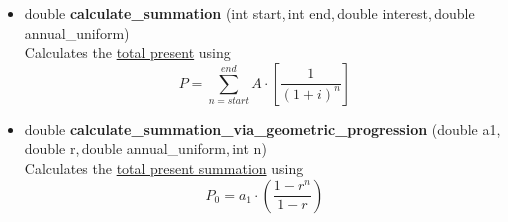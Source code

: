 \documentclass[english,12pt,a4paper,twoside,titlepage,leqno,fleqn]{article}
\begin{document}
\begin{enumerate}
\begin{enumerate}
\begin{itemize}
\item double {\bfseries calculate\_summation} \small{(int start,\,int end,\,double interest,\,double annual\_uniform)}\\
Calculates the \underline{total present} using \vspace{1cm} \[P = \sum_{n=start}^{end}{A\cdot\left[\frac{1}{\left(1+i\right)^{n}}\right]}
\]\vspace{1cm}

\item double {\bfseries  calculate\_summation\_via\_geometric\_progression} \small{(double a1,\,double r,\,double annual\_uniform,\,int n)}\\
Calculates the \underline{total present summation} using\vspace{1cm} \[P_{0}=a_{1}\cdot\left(\frac{1-r^{n}}{1-r}\right)
\]\vspace{1cm}


\end{itemize}
\end{enumerate}
\end{enumerate}
\end{document}
